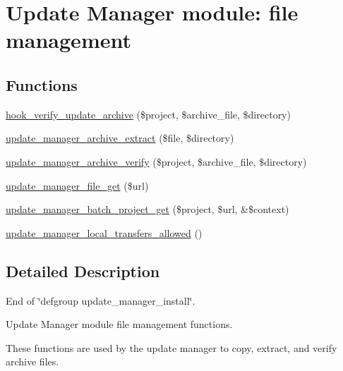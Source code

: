 \hypertarget{group__update__manager__file}{
\section{Update Manager module: file management}
\label{group__update__manager__file}
}
\subsection*{Functions}
\begin{DoxyCompactItemize}
\item 
\hyperlink{group__update__manager__file_ga68a5dd6bec824909f46d9458991eaf42}{hook\_\-verify\_\-update\_\-archive} (\$project, \$archive\_\-file, \$directory)
\item 
\hyperlink{group__update__manager__file_gaacbdc92035b1bb68dbb741a4917b8185}{update\_\-manager\_\-archive\_\-extract} (\$file, \$directory)
\item 
\hyperlink{group__update__manager__file_ga8c352241e56ce6de6b1064725d84801b}{update\_\-manager\_\-archive\_\-verify} (\$project, \$archive\_\-file, \$directory)
\item 
\hyperlink{group__update__manager__file_gaef701662a2b3a2bfff2c0b819860a547}{update\_\-manager\_\-file\_\-get} (\$url)
\item 
\hyperlink{group__update__manager__file_gad7fdbc7766b87956b181eb5fbec9a609}{update\_\-manager\_\-batch\_\-project\_\-get} (\$project, \$url, \&\$context)
\item 
\hyperlink{group__update__manager__file_ga88ed61885931bd3df617ca78b4fadb6c}{update\_\-manager\_\-local\_\-transfers\_\-allowed} ()
\end{DoxyCompactItemize}


\subsection{Detailed Description}
End of \char`\"{}defgroup update\_\-manager\_\-install\char`\"{}.

Update Manager module file management functions.

These functions are used by the update manager to copy, extract, and verify archive files. 

